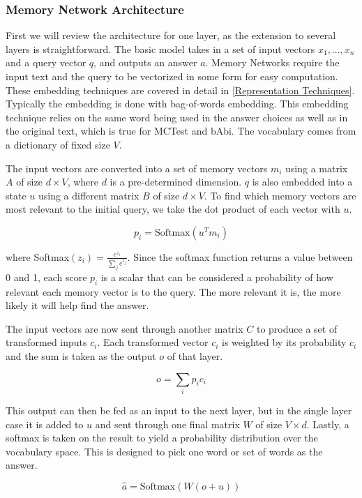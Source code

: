 \documentclass[pageno]{jpaper}
\begin{document}
\subsubsection{Memory Network Architecture}
\label{Memory Network Architecture}

First we will review the architecture for one layer, as the extension to several
layers is straightforward. The basic model takes in a set of input vectors $x_1, ...,
x_n$ and a query vector $q$, and outputs an answer $a$. Memory Networks require
the input text and the query to be vectorized in some form for easy computation.
These embedding techniques are covered in detail in \ref{Representation
Techniques}. Typically the embedding is done with bag-of-words embedding. This
embedding technique relies on the same word being used in the answer choices as
well as in the original text, which is true for MCTest and bAbi. The vocabulary
comes from a dictionary of fixed size $V$.

The input vectors are converted into a set of memory vectors ${m_i}$ using a
matrix $A$ of size $d\times V$, where $d$ is a pre-determined dimension. $q$ is
also embedded into a state $u$ using a different matrix $B$ of size $d\times V$.
To find which memory vectors are most relevant to the initial query, we take the
dot product of each vector with $u$.

$$p_i = \text{Softmax}(u^Tm_i)$$

where Softmax$(z_i) = \frac{e^{z_i}}{\sum_j e^{z_j}}$. Since the softmax function
returns a value between 0 and 1, each score $p_i$ is a scalar that can be considered
a probability of how relevant each memory vector is to the query. The more relevant
it is, the more likely it will help find the answer.

The input vectors are now sent through another matrix $C$ to produce a set of
transformed inputs ${c_i}$. Each transformed vector $c_i$ is weighted by its
probability $c_i$ and the sum is taken as the output $o$ of that layer.

$$o = \sum_i p_i c_i$$

This output can then be fed as an input to the next layer, but in the single
layer case it is added to $u$ and sent through one final matrix $W$ of size
$V\times d$. Lastly, a softmax is taken on the result to yield a probability
distribution over the vocabulary space. This is designed to pick one word
or set of words as the answer.

$$\hat{a} = \text{Softmax}\left(W\left(o + u\right)\right)$$
\end{document}
